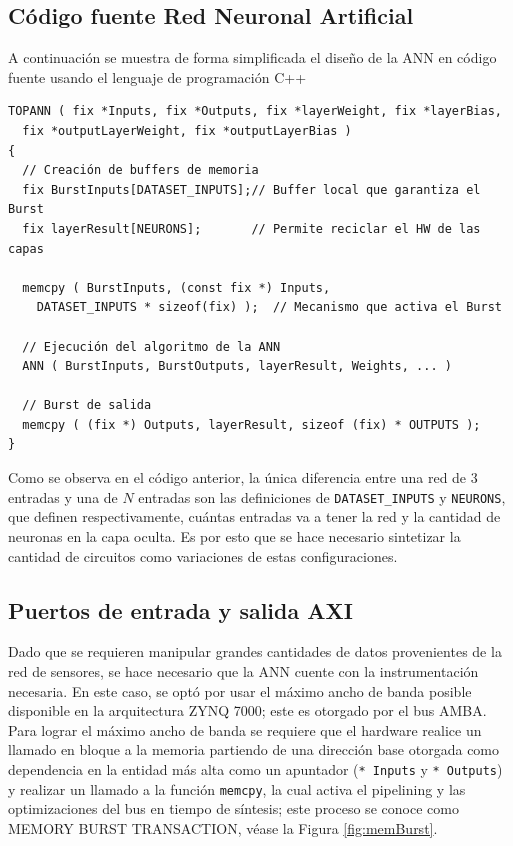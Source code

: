 \subsection{Código fuente Red Neuronal Artificial}

A continuación se muestra de forma simplificada el diseño de la ANN en código fuente usando el lenguaje de programación C++

\begin{verbatim}
TOPANN ( fix *Inputs, fix *Outputs, fix *layerWeight, fix *layerBias,
  fix *outputLayerWeight, fix *outputLayerBias )
{  
  // Creación de buffers de memoria
  fix BurstInputs[DATASET_INPUTS];// Buffer local que garantiza el Burst
  fix layerResult[NEURONS];       // Permite reciclar el HW de las capas

  memcpy ( BurstInputs, (const fix *) Inputs,
    DATASET_INPUTS * sizeof(fix) );  // Mecanismo que activa el Burst
  
  // Ejecución del algoritmo de la ANN
  ANN ( BurstInputs, BurstOutputs, layerResult, Weights, ... )
  
  // Burst de salida
  memcpy ( (fix *) Outputs, layerResult, sizeof (fix) * OUTPUTS );
}
\end{verbatim}

Como se observa en el código anterior, la única diferencia entre una red de $3$ entradas y una de $N$ entradas son las definiciones de \texttt{DATASET\_INPUTS} y \texttt{NEURONS}, que definen respectivamente, cuántas entradas va a tener la red y la cantidad de neuronas en la capa oculta. Es por esto que se hace necesario sintetizar la cantidad de circuitos como variaciones de estas configuraciones.

\subsection{Puertos de entrada y salida AXI}

Dado que se requieren manipular grandes cantidades de datos provenientes de la red de sensores, se hace necesario que la ANN cuente con la instrumentación necesaria. En este caso, se optó por usar el máximo ancho de banda posible disponible en la arquitectura ZYNQ 7000; este es otorgado por el bus AMBA. Para lograr el máximo ancho de banda se requiere que el hardware realice un llamado en bloque a la memoria partiendo de una dirección base otorgada como dependencia en la entidad más alta como un apuntador (\texttt{* Inputs} y \texttt{* Outputs}) y realizar un llamado a la función \texttt{memcpy}, la cual activa el pipelining y las optimizaciones del bus en tiempo de síntesis; este proceso se conoce como MEMORY BURST TRANSACTION, véase la Figura \ref{fig:memBurst}.

